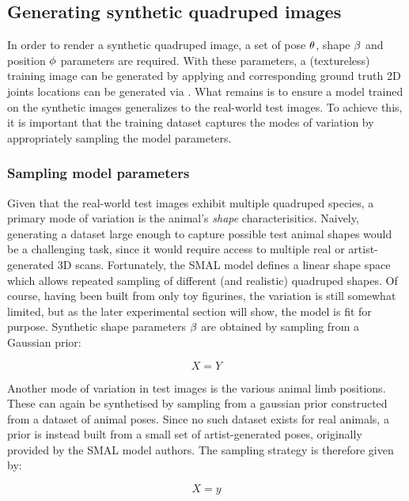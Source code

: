 \subsection{Generating synthetic quadruped images}

In order to render a synthetic quadruped image, a set of pose $\theta$, shape $\beta$ and position $\phi$ parameters are required. With these parameters, a (textureless) training image can be generated by applying  and corresponding ground truth 2D joints locations can be generated via . What remains is to ensure a model trained on the synthetic images generalizes to the real-world test images. To achieve this, it is important that the training dataset captures the modes of variation by appropriately sampling the model parameters. 

\subsubsection{Sampling model parameters}

Given that the real-world test images exhibit multiple quadruped species, a primary mode of variation is the animal's \emph{shape} characterisitics. Naively, generating a dataset large enough to capture possible test animal shapes would be a challenging task, since it would require access to multiple real or artist-generated 3D scans. Fortunately, the SMAL model defines a linear shape space which allows repeated sampling of different (and realistic) quadruped shapes. Of course, having been built from only toy figurines, the variation is still somewhat limited, but as the later experimental section will show, the model is fit for purpose. Synthetic shape parameters $\beta$ are obtained by sampling from a Gaussian prior:

\begin{equation}\label{eq:sampling_shape}
X = Y
\end{equation}

Another mode of variation in test images is the various animal limb positions. These can again be synthetised by sampling from a gaussian prior constructed from a dataset of animal poses. Since no such dataset exists for real animals, a prior is instead built from a small set of artist-generated poses, originally provided by the SMAL model authors. The sampling strategy is therefore given by:


\begin{equation}\label{eq:sampling_pose}
    X = y
\end{equation}


